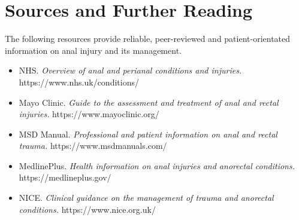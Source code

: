\section*{Sources and Further Reading}
The following resources provide reliable, peer-reviewed and patient-orientated information on anal injury and its management.

\begin{itemize}
    \item NHS. \textit{Overview of anal and perianal conditions and injuries.} https://www.nhs.uk/conditions/
    \item Mayo Clinic. \textit{Guide to the assessment and treatment of anal and rectal injuries.} https://www.mayoclinic.org/
    \item MSD Manual. \textit{Professional and patient information on anal and rectal trauma.} https://www.msdmanuals.com/
    \item MedlinePlus. \textit{Health information on anal injuries and anorectal conditions.} https://medlineplus.gov/
    \item NICE. \textit{Clinical guidance on the management of trauma and anorectal conditions.} https://www.nice.org.uk/
\end{itemize}
